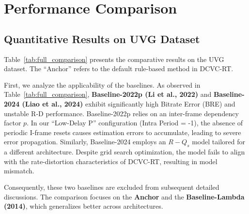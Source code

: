 \section{Performance Comparison}

\subsection{Quantitative Results on UVG Dataset}

Table~\ref{tab:full_comparison} presents the comparative results on the UVG dataset. The ``Anchor'' refers to the default rule-based method in DCVC-RT.

First, we analyze the applicability of the baselines. As observed in Table~\ref{tab:full_comparison}, \textbf{Baseline-2022p (Li et al., 2022)} and \textbf{Baseline-2024 (Liao et al., 2024)} exhibit significantly high Bitrate Error (BRE) and unstable R-D performance. 
Baseline-2022p relies on an inter-frame dependency factor $p$. In our ``Low-Delay P'' configuration (Intra Period = -1), the absence of periodic I-frame resets causes estimation errors to accumulate, leading to severe error propagation. 
Similarly, Baseline-2024 employs an $R-Q_s$ model tailored for a different architecture. Despite grid search optimization, the model fails to align with the rate-distortion characteristics of DCVC-RT, resulting in model mismatch.

Consequently, these two baselines are excluded from subsequent detailed discussions. The comparison focuses on the \textbf{Anchor} and the \textbf{Baseline-Lambda (2014)}, which generalizes better across architectures.

